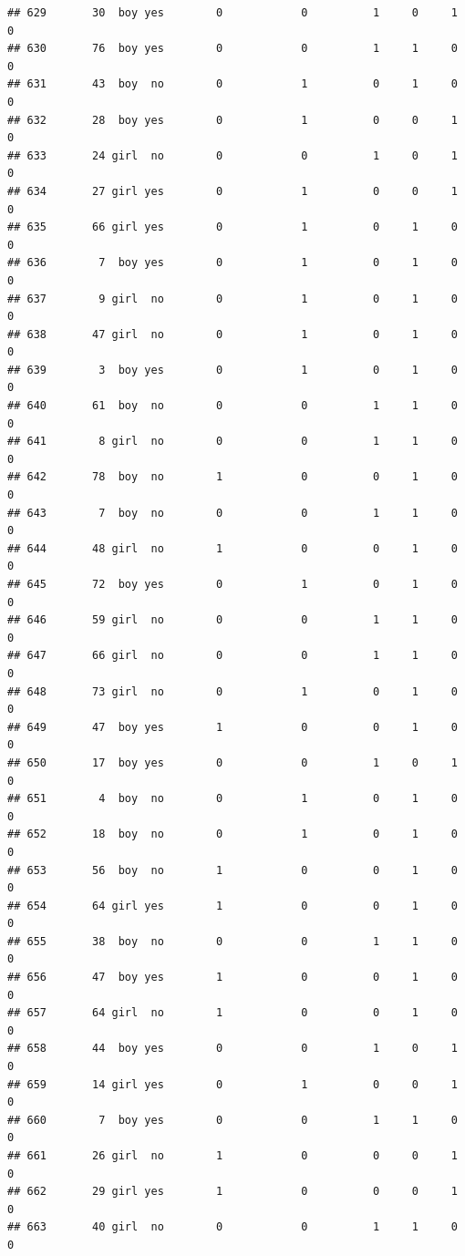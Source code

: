 \documentclass[man]{apa6}
\begin{document}
\begin{verbatim}
## 629       30  boy yes        0            0          1     0     1     0
## 630       76  boy yes        0            0          1     1     0     0
## 631       43  boy  no        0            1          0     1     0     0
## 632       28  boy yes        0            1          0     0     1     0
## 633       24 girl  no        0            0          1     0     1     0
## 634       27 girl yes        0            1          0     0     1     0
## 635       66 girl yes        0            1          0     1     0     0
## 636        7  boy yes        0            1          0     1     0     0
## 637        9 girl  no        0            1          0     1     0     0
## 638       47 girl  no        0            1          0     1     0     0
## 639        3  boy yes        0            1          0     1     0     0
## 640       61  boy  no        0            0          1     1     0     0
## 641        8 girl  no        0            0          1     1     0     0
## 642       78  boy  no        1            0          0     1     0     0
## 643        7  boy  no        0            0          1     1     0     0
## 644       48 girl  no        1            0          0     1     0     0
## 645       72  boy yes        0            1          0     1     0     0
## 646       59 girl  no        0            0          1     1     0     0
## 647       66 girl  no        0            0          1     1     0     0
## 648       73 girl  no        0            1          0     1     0     0
## 649       47  boy yes        1            0          0     1     0     0
## 650       17  boy yes        0            0          1     0     1     0
## 651        4  boy  no        0            1          0     1     0     0
## 652       18  boy  no        0            1          0     1     0     0
## 653       56  boy  no        1            0          0     1     0     0
## 654       64 girl yes        1            0          0     1     0     0
## 655       38  boy  no        0            0          1     1     0     0
## 656       47  boy yes        1            0          0     1     0     0
## 657       64 girl  no        1            0          0     1     0     0
## 658       44  boy yes        0            0          1     0     1     0
## 659       14 girl yes        0            1          0     0     1     0
## 660        7  boy yes        0            0          1     1     0     0
## 661       26 girl  no        1            0          0     0     1     0
## 662       29 girl yes        1            0          0     0     1     0
## 663       40 girl  no        0            0          1     1     0     0

\end{verbatim}
\end{document}
